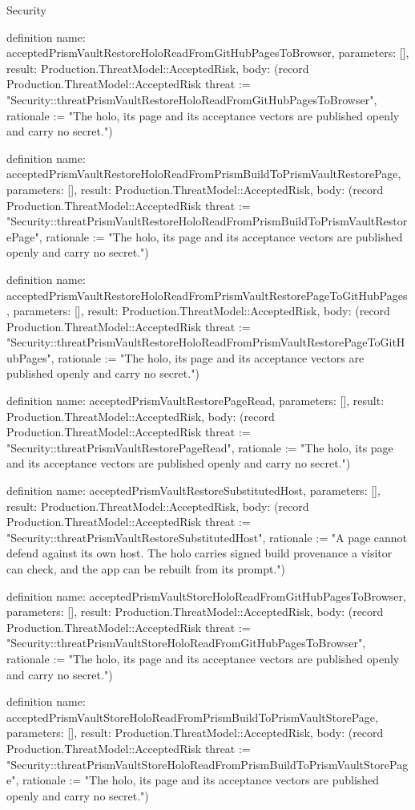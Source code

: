 \begin{lexlean}{Security}
\begin{semanticmodule}
definition{
  name: acceptedPrismVaultRestoreHoloReadFromGitHubPagesToBrowser,
  parameters: [],
  result: Production.ThreatModel::AcceptedRisk,
  body: (record Production.ThreatModel::AcceptedRisk {threat := "Security::threatPrismVaultRestoreHoloReadFromGitHubPagesToBrowser", rationale := "The holo, its page and its acceptance vectors are published openly and carry no secret."})
}

definition{
  name: acceptedPrismVaultRestoreHoloReadFromPrismBuildToPrismVaultRestorePage,
  parameters: [],
  result: Production.ThreatModel::AcceptedRisk,
  body: (record Production.ThreatModel::AcceptedRisk {threat := "Security::threatPrismVaultRestoreHoloReadFromPrismBuildToPrismVaultRestorePage", rationale := "The holo, its page and its acceptance vectors are published openly and carry no secret."})
}

definition{
  name: acceptedPrismVaultRestoreHoloReadFromPrismVaultRestorePageToGitHubPages,
  parameters: [],
  result: Production.ThreatModel::AcceptedRisk,
  body: (record Production.ThreatModel::AcceptedRisk {threat := "Security::threatPrismVaultRestoreHoloReadFromPrismVaultRestorePageToGitHubPages", rationale := "The holo, its page and its acceptance vectors are published openly and carry no secret."})
}

definition{
  name: acceptedPrismVaultRestorePageRead,
  parameters: [],
  result: Production.ThreatModel::AcceptedRisk,
  body: (record Production.ThreatModel::AcceptedRisk {threat := "Security::threatPrismVaultRestorePageRead", rationale := "The holo, its page and its acceptance vectors are published openly and carry no secret."})
}

definition{
  name: acceptedPrismVaultRestoreSubstitutedHost,
  parameters: [],
  result: Production.ThreatModel::AcceptedRisk,
  body: (record Production.ThreatModel::AcceptedRisk {threat := "Security::threatPrismVaultRestoreSubstitutedHost", rationale := "A page cannot defend against its own host. The holo carries signed build provenance a visitor can check, and the app can be rebuilt from its prompt."})
}

definition{
  name: acceptedPrismVaultStoreHoloReadFromGitHubPagesToBrowser,
  parameters: [],
  result: Production.ThreatModel::AcceptedRisk,
  body: (record Production.ThreatModel::AcceptedRisk {threat := "Security::threatPrismVaultStoreHoloReadFromGitHubPagesToBrowser", rationale := "The holo, its page and its acceptance vectors are published openly and carry no secret."})
}

definition{
  name: acceptedPrismVaultStoreHoloReadFromPrismBuildToPrismVaultStorePage,
  parameters: [],
  result: Production.ThreatModel::AcceptedRisk,
  body: (record Production.ThreatModel::AcceptedRisk {threat := "Security::threatPrismVaultStoreHoloReadFromPrismBuildToPrismVaultStorePage", rationale := "The holo, its page and its acceptance vectors are published openly and carry no secret."})
}


\end{semanticmodule}
\end{lexlean}
